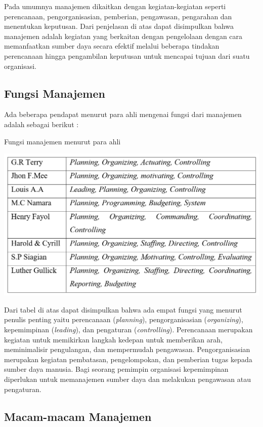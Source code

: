 Pada umumnya manajemen dikaitkan dengan kegiatan-kegiatan seperti perencanaan, pengorganisasian, pemberian, pengawasan, pengarahan dan menentukan keputusan. Dari penjelasan di atas dapat disimpulkan bahwa manajemen adalah kegiatan yang berkaitan dengan pengelolaan dengan cara memanfaatkan sumber daya secara efektif melalui beberapa tindakan perencanaan hingga pengambilan keputusan untuk mencapai tujuan dari suatu organisasi.

\subsection{Fungsi Manajemen}

Ada beberapa pendapat menurut para ahli mengenai fungsi dari manajemen adalah sebagai berikut \cite{rifai}: 

\begin{table}[H]
	\centering
	\caption{Fungsi manajemen menurut para ahli}
	\includegraphics[width=1.0\textwidth]{gambar/manajemenmenurutahli}
	\label{tabel_karaktermax2}
\end{table}

Dari tabel di atas dapat disimpulkan bahwa ada empat fungsi yang menurut penulis penting yaitu perencanaan (\emph{planning}), pengorganisasian (\emph{organizing}), kepemimpinan (\emph{leading}), dan pengaturan (\emph{controlling}). Perencanaan merupakan kegiatan untuk memikirkan langkah kedepan untuk memberikan arah, meminimalisir pengulangan, dan mempermudah pengawasan. Pengorganisasian merupakan kegiatan pembatasan, pengelompokan, dan pemberian tugas kepada sumber daya manusia. Bagi seorang pemimpin organisasi kepemimpinan diperlukan untuk memanajemen sumber daya dan melakukan pengawasan atau pengaturan.

\subsection{Macam-macam Manajemen}

